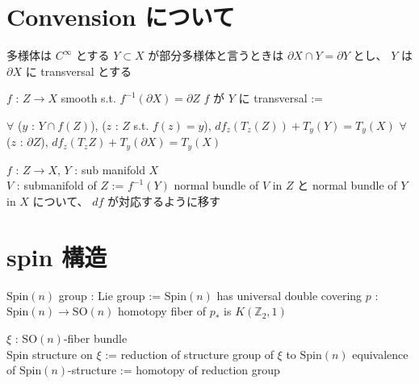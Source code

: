 \documentclass[dvipdfmx]{jsarticle}
\begin{document}
\section*{Convension について}

\begin{When}
\itemwhen
  多様体は \(C^\infty\) とする
\itemwhen
  \(Y \subset X\) が部分多様体と言うときは \(\partial X \cap Y = \partial Y\) とし、 \(Y\) は \(\partial X\) に transversal とする
\end{When}

\begin{Definition}
\itemwhen
  \For \(f\) : \(Z \to X\) smooth s.t. \(f^{-1}(\partial X) = \partial Z\)
\itemdefi
  \Define \(f\) が \(Y\) に transversal :=
  \begin{itemize}
    \itemwith \(\forall\) (\(y\) : \(Y \cap f(Z)\)), (\(z\) : \(Z\) s.t. \(f(z) = y\)), \(df_z(T_z (Z)) + T_y(Y) = T_y(X)\)
    \itemwith \(\forall\) (\(z\) : \(\partial Z\)), \(d f_z(T_z Z) + T_y(\partial X) = T_y(X)\)
  \end{itemize}
\end{Definition}

\begin{Theorem}
\itemwhen
  \For \(f\) : \(Z \to X\), \(Y\) : sub manifold \(X\) \\
  \Let \(V\) : submanifold of \(Z\) := \(f^{-1}(Y)\) 
\itemprop
  \Then normal bundle of \(V\) in \(Z\) と normal bundle of \(Y\) in \(X\) について、 \(df\) が対応するように移す
\end{Theorem}

\section*{spin 構造}

\begin{Definition}
\itemdefi
  \Define \(\text{Spin}(n)\) group : Lie group := 
\itemprop
  \Then \(\text{Spin}(n)\) has universal double covering \(p\) : \(\text{Spin}(n) \to \text{SO}(n)\)
\itemprop
  \Then homotopy fiber of \(p_*\) is \(K(\mathbb{Z}_2, 1)\)
\end{Definition}

\begin{Definition}
\itemdefi
  \For \(\xi\) : \(\text{SO}(n)\)-fiber bundle \\
  \Define Spin structure on \(\xi\) := reduction of structure group of \(\xi\) to \(\text{Spin}(n)\)
\itemdefi
  \Define equivalence of \(\text{Spin}(n)\)-structure := homotopy of reduction group
\end{Definition}
\end{document}
